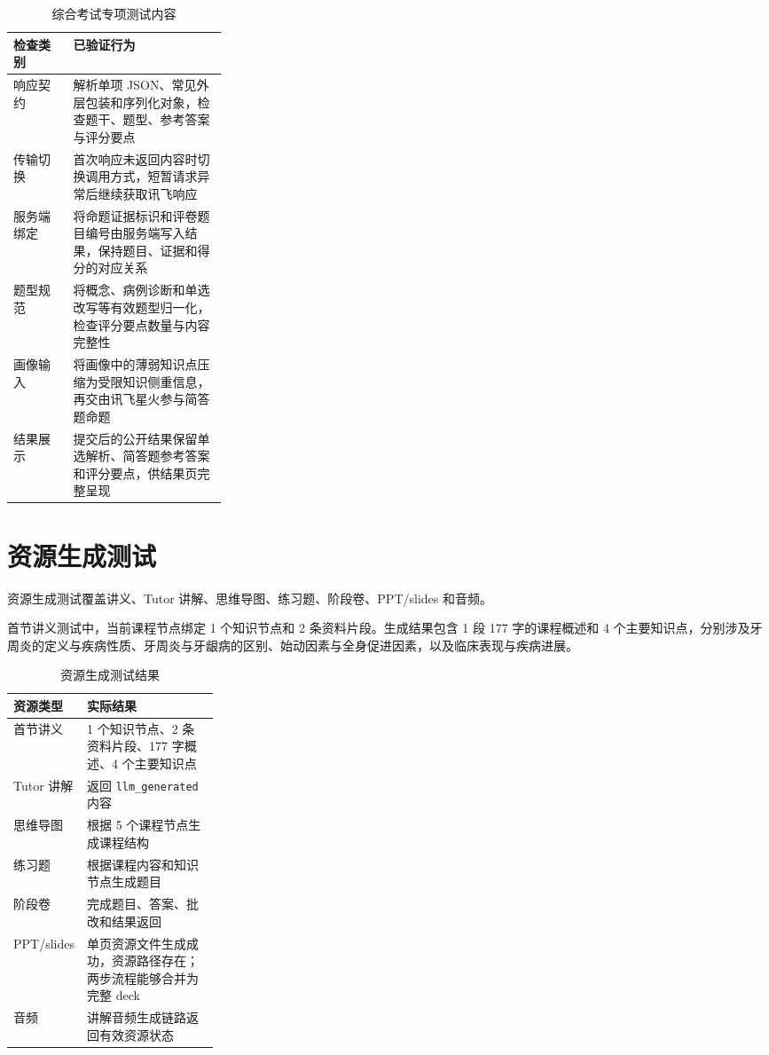 \begin{table}[H]
  \centering
  \caption{综合考试专项测试内容}
  \label{tab:comprehensive-exam-test}
  \begin{tabularx}{\linewidth}{p{0.28\linewidth}X}
    \toprule
    检查类别 & 已验证行为 \\
    \midrule
    响应契约 & 解析单项 JSON、常见外层包装和序列化对象，检查题干、题型、参考答案与评分要点 \\
    传输切换 & 首次响应未返回内容时切换调用方式，短暂请求异常后继续获取讯飞响应 \\
    服务端绑定 & 将命题证据标识和评卷题目编号由服务端写入结果，保持题目、证据和得分的对应关系 \\
    题型规范 & 将概念、病例诊断和单选改写等有效题型归一化，检查评分要点数量与内容完整性 \\
    画像输入 & 将画像中的薄弱知识点压缩为受限知识侧重信息，再交由讯飞星火参与简答题命题 \\
    结果展示 & 提交后的公开结果保留单选解析、简答题参考答案和评分要点，供结果页完整呈现 \\
    \bottomrule
  \end{tabularx}
\end{table}

\section{资源生成测试}

资源生成测试覆盖讲义、Tutor 讲解、思维导图、练习题、阶段卷、PPT/slides 和音频。

首节讲义测试中，当前课程节点绑定 1 个知识节点和 2 条资料片段。生成结果包含 1 段 177 字的课程概述和 4 个主要知识点，分别涉及牙周炎的定义与疾病性质、牙周炎与牙龈病的区别、始动因素与全身促进因素，以及临床表现与疾病进展。

\begin{table}[H]
  \centering
  \caption{资源生成测试结果}
  \label{tab:resource-test}
  \begin{tabularx}{\linewidth}{p{0.27\linewidth}X}
    \toprule
    资源类型 & 实际结果 \\
    \midrule
    首节讲义 & 1 个知识节点、2 条资料片段、177 字概述、4 个主要知识点 \\
    Tutor 讲解 & 返回 \texttt{llm\_generated} 内容 \\
    思维导图 & 根据 5 个课程节点生成课程结构 \\
    练习题 & 根据课程内容和知识节点生成题目 \\
    阶段卷 & 完成题目、答案、批改和结果返回 \\
    PPT/slides & 单页资源文件生成成功，资源路径存在；两步流程能够合并为完整 deck \\
    音频 & 讲解音频生成链路返回有效资源状态 \\
    \bottomrule
  \end{tabularx}
\end{table}

